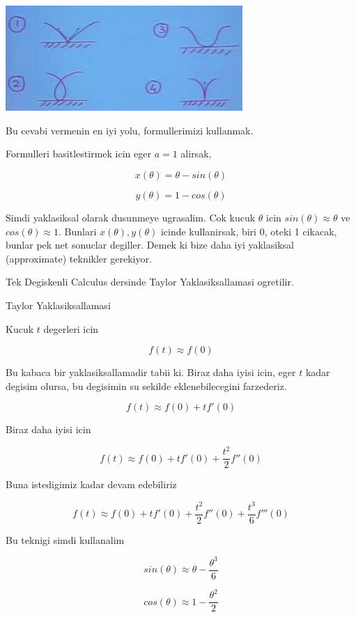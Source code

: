 \documentclass[12pt,fleqn]{article}
\begin{document}
\includegraphics[height=4cm]{5_8.png}

Bu cevabi vermenin en iyi yolu, formullerimizi kullanmak. 

Formulleri basitlestirmek icin eger $a=1$ alirsak, 

\[ x(\theta) = \theta - sin(\theta) \]

\[ y(\theta) = 1 - cos(\theta) \]

Simdi yaklasiksal olarak dusunmeye ugrasalim. Cok kucuk $\theta$ icin
$sin(\theta) \approx \theta$ ve $cos(\theta) \approx 1$. Bunlari
$x(\theta), y(\theta)$ icinde kullanirsak, biri 0, oteki 1 cikacak, bunlar
pek net sonuclar degiller. Demek ki bize daha iyi yaklasiksal (approximate)
teknikler gerekiyor. 

Tek Degiskenli Calculus dersinde Taylor Yaklasiksallamasi ogretilir. 

Taylor Yaklasiksallamasi

Kucuk $t$ degerleri icin 

\[ f(t) \approx f(0) \]

Bu kabaca bir yaklasiksallamadir tabii ki. Biraz daha iyisi icin, eger $t$
kadar degisim olursa, bu degisimin su sekilde eklenebilecegini farzederiz.

\[ f(t) \approx f(0) + tf'(0)\]

Biraz daha iyisi icin

\[ f(t) \approx f(0) + tf'(0) + \frac{t^2}{2}f''(0)\]

Buna istedigimiz kadar devam edebiliriz

\[ f(t) \approx f(0) + tf'(0) + \frac{t^2}{2}f''(0) + \frac{t^3}{6}f'''(0)\]

Bu teknigi simdi kullanalim

\[ sin(\theta) \approx \theta - \frac{\theta^3}{6} \]

\[ cos(\theta) \approx 1 - \frac{\theta^2}{2} \]
\end{document}
